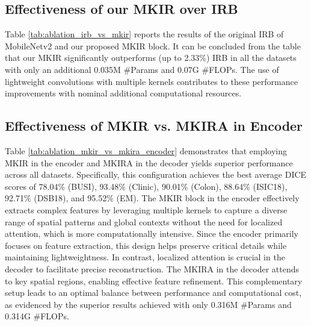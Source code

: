 \subsection{Effectiveness of our MKIR over IRB \cite{sandler2018mobilenetv2}}
\label{app:irb_mkir}

Table \ref{tab:ablation_irb_vs_mkir} reports the results of the original IRB of MobileNetv2 \cite{sandler2018mobilenetv2} and our proposed MKIR block. It can be concluded from the table that our MKIR significantly outperforms (up to 2.33\%) IRB in all the datasets with only an additional 0.035M \#Params and 0.07G \#FLOPs. The use of lightweight convolutions with multiple kernels contributes to these performance improvements with nominal additional computational resources.     



\subsection{Effectiveness of MKIR vs. MKIRA in Encoder}
\label{assec:mkir_mkira}
Table \ref{tab:ablation_mkir_vs_mkira_encoder} demonstrates that employing MKIR in the encoder and MKIRA in the decoder yields superior performance across all datasets. Specifically, this configuration achieves the best average DICE scores of 78.04\% (BUSI), 93.48\% (Clinic), 90.01\% (Colon), 88.64\% (ISIC18), 92.71\% (DSB18), and 95.52\% (EM). The MKIR block in the encoder effectively extracts complex features by leveraging multiple kernels to capture a diverse range of spatial patterns and global contexts without the need for localized attention, which is more computationally intensive. Since the encoder primarily focuses on feature extraction, this design helps preserve critical details while maintaining lightweightness. In contrast, localized attention is crucial in the decoder to facilitate precise reconstruction. The MKIRA in the decoder attends to key spatial regions, enabling effective feature refinement. This complementary setup leads to an optimal balance between performance and computational cost, as evidenced by the superior results achieved with only 0.316M \#Params and 0.314G \#FLOPs.

